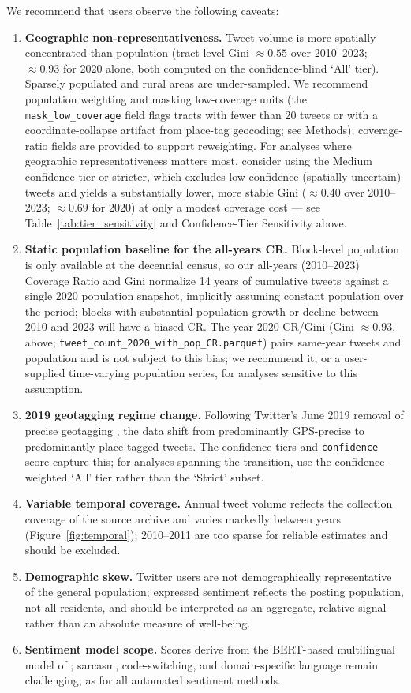 \documentclass[fleqn,10pt]{wlscirep}
\begin{document}
We recommend that users observe the following caveats:
\begin{enumerate}
    \item \textbf{Geographic non-representativeness.} Tweet volume is more spatially concentrated than population (tract-level Gini $\approx 0.55$ over 2010--2023; $\approx 0.93$ for 2020 alone, both computed on the confidence-blind `All' tier). Sparsely populated and rural areas are under-sampled. We recommend population weighting and masking low-coverage units (the \texttt{mask\_low\_coverage} field flags tracts with fewer than 20 tweets or with a coordinate-collapse artifact from place-tag geocoding; see Methods); coverage-ratio fields are provided to support reweighting. For analyses where geographic representativeness matters most, consider using the Medium confidence tier or stricter, which excludes low-confidence (spatially uncertain) tweets and yields a substantially lower, more stable Gini ($\approx 0.40$ over 2010--2023; $\approx 0.69$ for 2020) at only a modest coverage cost --- see Table~\ref{tab:tier_sensitivity} and Confidence-Tier Sensitivity above.
    \item \textbf{Static population baseline for the all-years CR.} Block-level population is only available at the decennial census, so our all-years (2010--2023) Coverage Ratio and Gini normalize 14 years of cumulative tweets against a single 2020 population snapshot, implicitly assuming constant population over the period; blocks with substantial population growth or decline between 2010 and 2023 will have a biased CR. The year-2020 CR/Gini (Gini $\approx 0.93$, above; \texttt{tweet\_count\_2020\_with\_pop\_CR.parquet}) pairs same-year tweets and population and is not subject to this bias; we recommend it, or a user-supplied time-varying population series, for analyses sensitive to this assumption.
    \item \textbf{2019 geotagging regime change.} Following Twitter's June 2019 removal of precise geotagging \cite{huUnderstandingRemovalPrecise2020}, the data shift from predominantly GPS-precise to predominantly place-tagged tweets. The confidence tiers and \texttt{confidence} score capture this; for analyses spanning the transition, use the confidence-weighted `All' tier rather than the `Strict' subset.
    \item \textbf{Variable temporal coverage.} Annual tweet volume reflects the collection coverage of the source archive and varies markedly between years (Figure~\ref{fig:temporal}); 2010--2011 are too sparse for reliable estimates and should be excluded.
    \item \textbf{Demographic skew.} Twitter users are not demographically representative of the general population; expressed sentiment reflects the posting population, not all residents, and should be interpreted as an aggregate, relative signal rather than an absolute measure of well-being.
    \item \textbf{Sentiment model scope.} Scores derive from the BERT-based multilingual model of \cite{chaiTwitterSentimentGeographical2023a}; sarcasm, code-switching, and domain-specific language remain challenging, as for all automated sentiment methods.
\end{enumerate}
\end{document}

